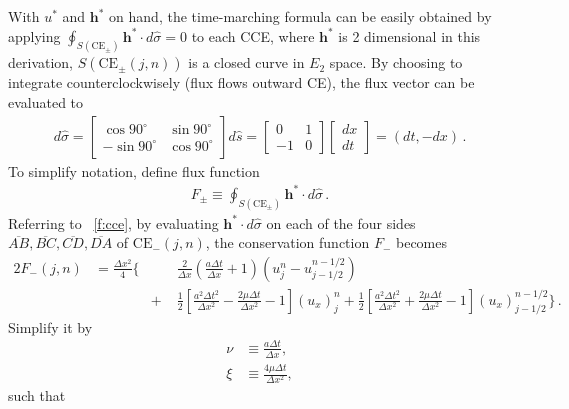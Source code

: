 \documentclass[letterpaper,12pt,dvips]{article}
\renewcommand{\vec}[1]{\mathbf{#1}}
\numberwithin{equation}{section}
\begin{document}
With $u^*$ and $\vec{h}^*$ on hand, the time-marching formula can be 
easily obtained by applying 
$\oint_{S(\mathrm{CE}_{\pm})}\vec{h}^*\cdot d\hat{\sigma}=0$ to each CCE, 
where $\vec{h}^*$ is 2 dimensional in this derivation, 
$S(\mathrm{CE}_{\pm}(j,n))$ is a closed curve in $E_2$ space.
By choosing to integrate counterclockwisely (flux flows outward CE), the 
flux vector can be evaluated to 
\begin{align*}
  d\hat{\sigma} 
  = \left[\begin{array}{cc} \cos90^{\circ} & \sin90^{\circ} \\ 
                           -\sin90^{\circ} & \cos90^{\circ} 
    \end{array}\right] d\hat{s}
  = \left[\begin{array}{cc} 0 & 1 \\ 
                           -1 & 0 
    \end{array}\right] 
    \left[\begin{array}{c} dx \\ dt 
    \end{array}\right]
  = (dt, -dx) \,.
\end{align*}
To simplify notation, define flux function
\begin{align*}
  F_{\pm} \equiv 
    \oint_{S(\mathrm{CE}_{\pm})}\vec{h}^*\cdot d\hat{\sigma} \,.
\end{align*}
Referring to \figurename~\ref{f:cce}, by evaluating 
$\vec{h}^*\cdot d\hat{\sigma}$ on each of the four sides 
$\overline{AB}, \overline{BC}, \overline{CD}, \overline{DA}$ of 
$\mathrm{CE}_-(j,n)$, the conservation function $F_-$ becomes
\begin{alignat*}{2}
  F_-(j,n) &= \frac{\Delta x^2}{4}\Big\{
    &&\frac{2}{\Delta x}\left(\frac{a\Delta t}{\Delta x}+1\right)
      \left(u_j^n-u_{j-1/2}^{n-1/2}\right) \\
  & &+\;& \frac{1}{2}\left[
          \frac{a^2\Delta t^2}{\Delta x^2} 
        - \frac{2\mu\Delta t} {\Delta x^2} - 1 
        \right](u_x)_j^n
    +     \frac{1}{2}\left[
          \frac{a^2\Delta t^2}{\Delta x^2} 
        + \frac{2\mu\Delta t} {\Delta x^2} - 1 
        \right](u_x)_{j-1/2}^{n-1/2}
    \Big\}\,.
\end{alignat*}
Simplify it by 
\begin{align}
  \nu &\equiv \frac{a\Delta t}{\Delta x}, \label{e:nu} \\
  \xi &\equiv \frac{4\mu\Delta t}{\Delta x^2}, \label{e:xi}
\end{align}
such that 
\end{document}
